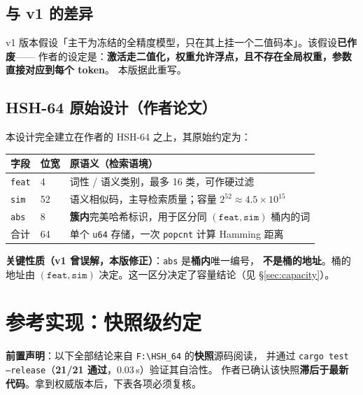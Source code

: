 \documentclass[11pt,a4paper]{ctexart}
\newcommand{\warn}[1]{\textcolor{warnred}{\textbf{#1}}}
\newcommand{\ok}[1]{\textcolor{okgreen}{\textbf{#1}}}
\theoremstyle{definition}
\begin{document}
\subsection{与 v1 的差异}

v1 版本假设「主干为冻结的全精度模型，只在其上挂一个二值码本」。该假设\textbf{已作废}——
作者的设定是：\textbf{激活走二值化，权重允许浮点，且不存在全局权重，参数直接对应到每个 token}。
本版据此重写。

\subsection{HSH-64 原始设计（作者论文）}

本设计完全建立在作者的 HSH-64 之上，其原始约定为：

\begin{center}
\begin{tabularx}{\textwidth}{@{}llX@{}}
\toprule
\textbf{字段} & \textbf{位宽} & \textbf{原语义（检索语境）} \\
\midrule
\texttt{feat} & 4 & 词性 / 语义类别，最多 16 类，可作硬过滤 \\
\texttt{sim}  & 52 & 语义相似码，主导检索质量；容量 $2^{52}\approx 4.5\times10^{15}$ \\
\texttt{abs}  & 8 & \textbf{簇内}完美哈希标识，用于区分同 $(\texttt{feat},\texttt{sim})$ 桶内的词 \\
\midrule
合计 & 64 & 单个 \texttt{u64} 存储，一次 \texttt{popcnt} 计算 Hamming 距离 \\
\bottomrule
\end{tabularx}
\end{center}

\warn{关键性质（v1 曾误解，本版修正）}：\texttt{abs} 是\textbf{桶内}唯一编号，
\textbf{不是桶的地址}。桶的地址由 $(\texttt{feat},\texttt{sim})$ 决定。这一区分决定了容量结论（见 \S\ref{sec:capacity}）。

\section{参考实现：快照级约定}\label{sec:snapshot}

\begin{center}
\begin{minipage}{0.94\textwidth}
\colorbox{graylight}{\begin{minipage}{0.92\textwidth}\vspace{3pt}
\small
\warn{前置声明}：以下全部结论来自 \texttt{F:\textbackslash HSH\_64} 的\textbf{快照}源码阅读，
并通过 \texttt{cargo test --release}（\ok{21/21 通过}，0.03\,s）验证其自洽性。
作者已确认该快照\textbf{滞后于最新代码}。拿到权威版本后，下表各项必须复核。
\vspace{3pt}\end{minipage}}
\end{minipage}
\end{center}
\end{document}
